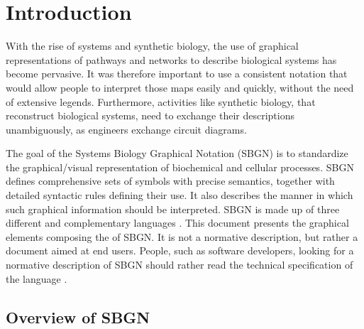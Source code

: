 

\chapter{Introduction}

With the rise of systems and synthetic biology, the use of graphical representations of pathways and networks to describe biological systems has become pervasive. It was therefore important to use a consistent notation that would allow people to interpret those maps easily and quickly, without the need of extensive legends. Furthermore, activities like synthetic biology, that reconstruct biological systems, need to exchange their descriptions unambiguously, as engineers exchange circuit diagrams. 

The goal of the Systems Biology Graphical Notation (SBGN) is to standardize the graphical/visual representation of biochemical and cellular processes. SBGN defines comprehensive sets of symbols with precise semantics, together with detailed syntactic rules defining their use.  
It also describes the manner in which such graphical information should be interpreted. SBGN is made up of three different and complementary languages \cite{LeNovere:2009p1}. This document presents the graphical elements composing the \emph{\PDl{}} of SBGN. It is not a normative description, but rather a document aimed at end users. People, such as software developers, looking for a normative description of SBGN \PDs should rather read the technical specification of the language \cite{Moodie:2011}.

\section{Overview of SBGN \PDs}
\label{sec:PD-overview}

